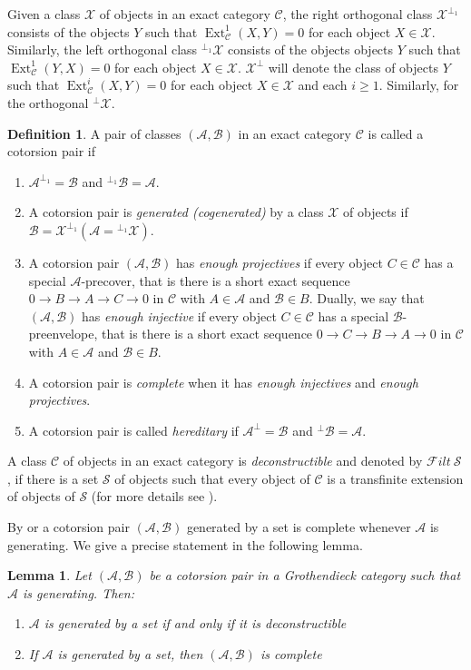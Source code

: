 \documentclass[11pt,a4paper,reqno]{amsart}
\newcommand{\Ext}{\operatorname{Ext}}
\newcommand{\A}{\mathcal{A}}
\newcommand{\B}{\mathcal{B}}
\newcommand{\C}{\mathcal{C}}
\newcommand{\F}{\mathcal{F}}
\newcommand{\clS}{\mathcal{S}}
\newcommand{\X}{\mathcal{X}}
\theoremstyle{plain}
\newtheorem{lem}[thm]{Lemma}
\theoremstyle{definition}
\newtheorem{defn}[thm]{Definition}
\theoremstyle{remark}
\begin{document}
Given a class $\X$ of objects in an exact category $\C$, the right orthogonal class $\X^{\perp_1}$ consists of the objects $Y$ such that $\Ext^1_{\C}(X,Y)=0$ for each object $X\in \X$. Similarly, the left orthogonal class $^{\perp_1}\X $ consists of the objects objects $Y$ such that $\Ext^1_{\C}(Y,X)=0$ for each object $X\in \X$.
$\X^\perp$ will denote the class of objects $Y$ such that $\Ext^i_{\C}(X,Y)=0$ for each object $X\in \X$ and each $i\geq 1$. Similarly, for the orthogonal $^\perp\X $.
%
\begin{defn}\label{D:cotorsion-pair} A pair of classes $(\A, \B)$ in an exact category $\C$ is called a cotorsion pair if
\begin{enumerate}
\item $\A^{\perp_1}=\B$ and $^{\perp_1} \B=\A$.
\item A cotorsion pair is \emph{generated (cogenerated)} by a class $\X$ of objects if $\B=\X^{\perp_1} (\A={^{\perp_1}\X})$.
\item A cotorsion pair $(\A, \B)$ has \emph{enough projectives} if every object $C\in \C$ has a special $\A$-precover, that is there is a short exact sequence $0\to B\to A\to C\to 0$ in $\C$ with $A\in \A$ and $\B\in B$. Dually, we say that  $(\A, \B)$ has \emph{enough injective} if every object $C\in \C$ has a special $\B$-preenvelope, that is there is a short exact sequence $0\to C\to B\to A\to 0$ in $\C$ with $A\in \A$ and $\B\in B$.
\item A cotorsion pair is \emph{complete} when it has \emph{enough injectives} and \emph{enough projectives}.
\item A cotorsion pair is called \emph{hereditary} if $\A^\perp=\B$ and $^{\perp} \B=\A$.
\end{enumerate}
\end{defn}
A class $\C$ of objects in an exact category is \emph{deconstructible} and denoted by $\F ilt\ \clS$, if there is a set $\clS$ of objects such that every object of $\C$ is a transfinite extension of objects of $\clS$ (for more details see \cite[Definition 3.7 and 3.10]{Sto13}).

By \cite{ET01} or \cite{Q} a cotorsion pair $(\A,\B)$ generated by a set is complete whenever $\A$ is generating. We give a precise statement in the following lemma.

\begin{lem}\label{lem1_2} Let $(\A,\B)$ be a cotorsion pair in a Grothendieck category such that $\A$ is generating. Then:
  \begin{enumerate}
    \item $\A$ is generated by a set if and only if it is deconstructible
    \item If $\A$ is generated by a set, then $(\A,\B)$ is complete
  \end{enumerate}
\end{lem}
\end{document}
